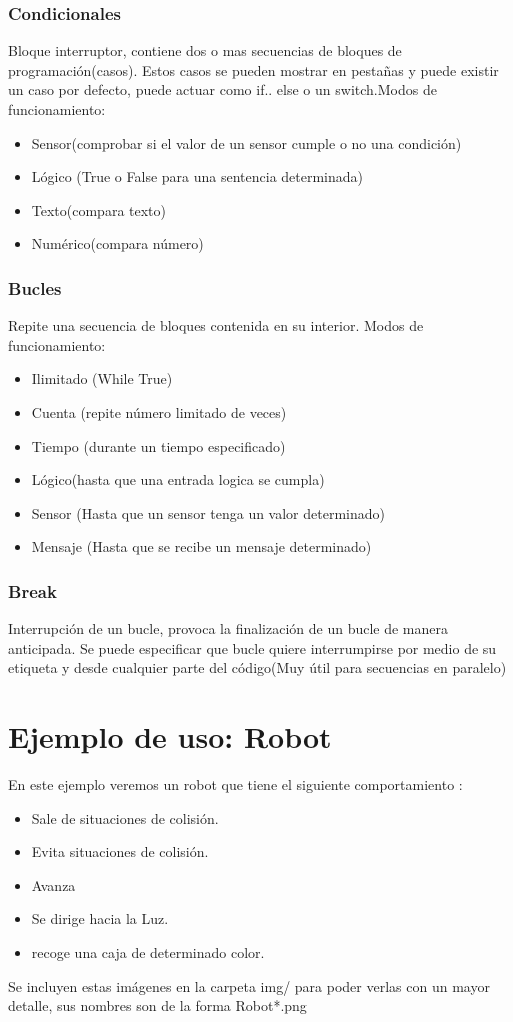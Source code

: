 \documentclass[12pt,a4paper]{article}
\begin{document}
\subsubsection{Condicionales}
Bloque interruptor, contiene dos o mas secuencias de bloques de programación(casos). Estos casos se pueden mostrar en pestañas y puede existir un caso por defecto, puede actuar como if.. else o un switch.Modos de funcionamiento:
\begin{itemize}
\item Sensor(comprobar si el valor de un sensor cumple o no una condición)
\item Lógico (True o False para una sentencia determinada)
\item Texto(compara texto)
\item Numérico(compara número)
\end{itemize}
\subsubsection{Bucles}
Repite una secuencia de bloques contenida en su interior.
Modos de funcionamiento:
\begin{itemize}
\item Ilimitado (While True)
\item Cuenta (repite número limitado de veces)
\item Tiempo (durante un tiempo especificado)
\item Lógico(hasta que una entrada logica se cumpla)
\item Sensor (Hasta que un sensor tenga un valor determinado)
\item Mensaje (Hasta que se recibe un mensaje determinado)
\end{itemize}
\subsubsection{Break}
Interrupción de un bucle, provoca la finalización de un bucle de manera anticipada. Se puede especificar que bucle quiere interrumpirse por medio de su etiqueta y desde cualquier parte del código(Muy útil para secuencias en paralelo)
\clearpage 
\section{Ejemplo de uso: Robot }
En este ejemplo veremos un robot que tiene el siguiente comportamiento : 
\begin{itemize}
\item Sale de situaciones de colisión.
\item Evita situaciones de colisión.
\item Avanza
\item Se dirige hacia la Luz.
\item recoge una caja de determinado color.
\end{itemize}
Se incluyen estas imágenes en la carpeta img/ para poder verlas con un mayor detalle, sus nombres son de la forma Robot*.png
\end{document}
